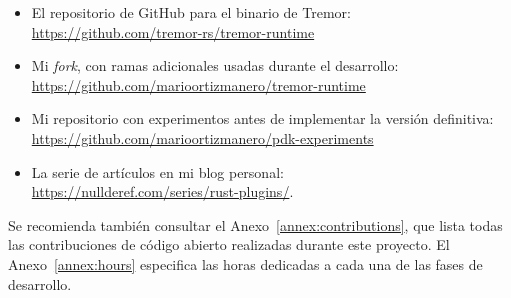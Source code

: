 \begin{itemize}
    \item El repositorio de GitHub para el binario de Tremor:\\
        \url{https://github.com/tremor-rs/tremor-runtime}
    \item Mi \emph{fork}, con ramas adicionales usadas durante el desarrollo:\\
        \url{https://github.com/marioortizmanero/tremor-runtime}
    \item Mi repositorio con experimentos antes de implementar la versión
        definitiva:\\
        \url{https://github.com/marioortizmanero/pdk-experiments}
    \item La serie de artículos en mi blog personal:\\
        \url{https://nullderef.com/series/rust-plugins/}.
\end{itemize}

Se recomienda también consultar el Anexo~\ref{annex:contributions}, que lista
todas las contribuciones de código abierto realizadas durante este proyecto. El
Anexo~\ref{annex:hours} especifica las horas dedicadas a cada una de las fases
de desarrollo.
